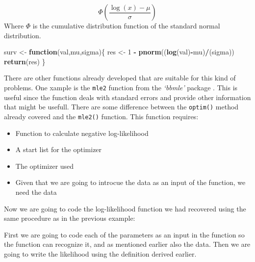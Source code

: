 \documentclass[]{book}
\newenvironment{Shaded}{\begin{snugshade}}{\end{snugshade}}
\newcommand{\KeywordTok}[1]{\textcolor[rgb]{0.13,0.29,0.53}{\textbf{#1}}}
\newcommand{\DecValTok}[1]{\textcolor[rgb]{0.00,0.00,0.81}{#1}}
\newcommand{\StringTok}[1]{\textcolor[rgb]{0.31,0.60,0.02}{#1}}
\newcommand{\ControlFlowTok}[1]{\textcolor[rgb]{0.13,0.29,0.53}{\textbf{#1}}}
\newcommand{\OperatorTok}[1]{\textcolor[rgb]{0.81,0.36,0.00}{\textbf{#1}}}
\newcommand{\NormalTok}[1]{#1}
\begin{document}
\[\Phi \left( \frac{\log(x) - \mu}{\sigma} \right)\] Where \(\Phi\) is
the cumulative distribution function of the standard normal
distribution.

\begin{Shaded}
\begin{Highlighting}[]
\NormalTok{surv <-}\StringTok{ }\ControlFlowTok{function}\NormalTok{(val,mu,sigma)\{}
\NormalTok{        res <-}\StringTok{ }\DecValTok{1} \OperatorTok{-}\StringTok{ }\KeywordTok{pnorm}\NormalTok{((}\KeywordTok{log}\NormalTok{(val)}\OperatorTok{-}\NormalTok{mu)}\OperatorTok{/}\NormalTok{(sigma))}
        \KeywordTok{return}\NormalTok{(res)}
\NormalTok{\}}
\end{Highlighting}
\end{Shaded}

There are other functions already developed that are suitable for this
kind of problems. One xample is the \texttt{mle2} function from the
\emph{`bbmle'} package \citep{R-bbmle}. This is useful since the
function deals with standard errors and provide other information that
might be usefull. There are some difference between the \texttt{optim()}
method already covered and the \texttt{mle2()} function. This function
requires:

\begin{itemize}
\item
  Function to calculate negative log-likelihood
\item
  A start list for the optimizer
\item
  The optimizer used
\item
  Given that we are going to introcue the data as an input of the
  function, we need the data
\end{itemize}

Now we are going to code the log-likelihood function we had recovered
using the same procedure as in the previous example:

First we are going to code each of the parameters as an input in the
function so the function can recognize it, and as mentioned earlier also
the data. Then we are going to write the likelihood using the definition
derived earlier.
\end{document}
